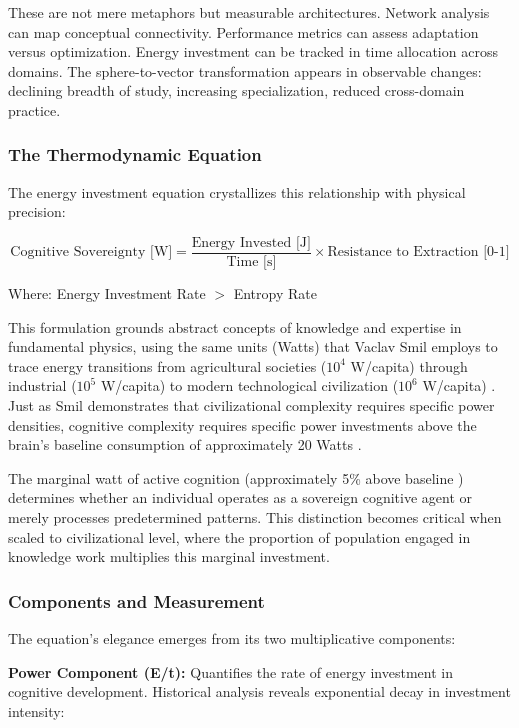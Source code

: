 These are not mere metaphors but measurable architectures. Network analysis can map conceptual connectivity. Performance metrics can assess adaptation versus optimization. Energy investment can be tracked in time allocation across domains. The sphere-to-vector transformation appears in observable changes: declining breadth of study, increasing specialization, reduced cross-domain practice.

\subsubsection{The Thermodynamic Equation}

The energy investment equation crystallizes this relationship with physical precision:

\begin{equation}
\text{Cognitive Sovereignty [W]} = \frac{\text{Energy Invested [J]}}{\text{Time [s]}} \times \text{Resistance to Extraction [0-1]}
\end{equation}

Where: Energy Investment Rate $>$ Entropy Rate

This formulation grounds abstract concepts of knowledge and expertise in fundamental physics, using the same units (Watts) that Vaclav Smil employs to trace energy transitions from agricultural societies ($10^4$ W/capita) through industrial ($10^5$ W/capita) to modern technological civilization ($10^6$ W/capita) \citep{smil2017}. Just as Smil demonstrates that civilizational complexity requires specific power densities, cognitive complexity requires specific power investments above the brain's baseline consumption of approximately 20 Watts \citep{raichle2002}.

The marginal watt of active cognition (approximately 5\% above baseline \citep{jamadar2025}) determines whether an individual operates as a sovereign cognitive agent or merely processes predetermined patterns. This distinction becomes critical when scaled to civilizational level, where the proportion of population engaged in knowledge work multiplies this marginal investment.

\subsubsection{Components and Measurement}

The equation's elegance emerges from its two multiplicative components:

\textbf{Power Component (E/t):} Quantifies the rate of energy investment in cognitive development. Historical analysis reveals exponential decay in investment intensity:

